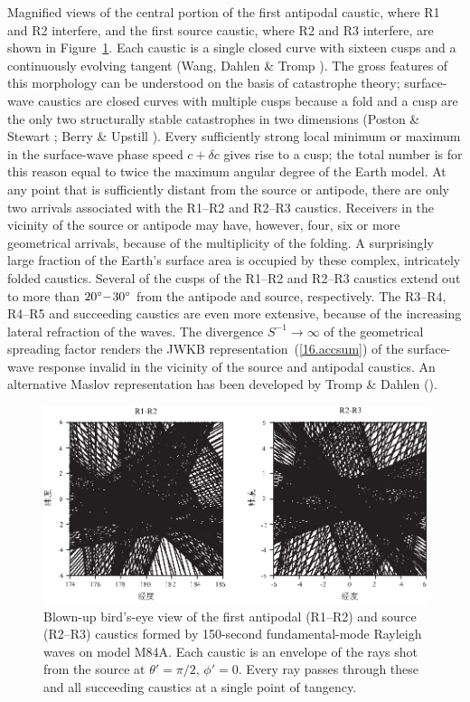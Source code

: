Magnified views of the central portion of
the first antipodal caustic,
where R1 and R2 interfere,
and the first source caustic,
where R2 and R3 interfere, are shown in Figure~\ref{fig:16.caustics}.
Each caustic is a single closed curve with sixteen
cusps and a continuously evolving tangent
(Wang, Dahlen \& Tromp \citeyear{wang&al93}).
The gross features of this morphology can
be understood on the basis of catastrophe theory;
surface-wave caustics are closed
curves with multiple cusps
because a fold and a cusp are
the only two structurally stable
catastrophes in two dimensions
(Poston \& Stewart \citeyear{poston&stewart78};
Berry \& Upstill \citeyear{berry&upstill80}).
Every sufficiently strong local minimum or
maximum in the surface-wave phase speed
$c+\delta c$ gives rise to a cusp;
the total number is for this
reason equal to twice the maximum
angular degree of the Earth model.
At any point that is sufficiently distant from
the source or antipode, there are only two arrivals
associated with the R1--R2 and R2--R3 caustics.
Receivers in the vicinity of the source or antipode
may have, however, four, six or more geometrical
arrivals, because of the multiplicity of the
folding. A surprisingly large fraction of the
Earth's surface area is occupied by these
complex, intricately folded caustics.
Several of the cusps of the R1--R2 and R2--R3
caustics extend out to more than
$20^{\circ}\hspace{-0.9 mm}-\!30^{\circ}$
from the antipode and source, respectively.
The R3--R4, R4--R5 and succeeding caustics are
even more extensive, because of the increasing lateral
refraction of the waves.  The divergence $S^{-1}
\rightarrow\infty$ of the geometrical spreading
factor renders the JWKB representation~(\ref{16.accsum})
of the surface-wave response invalid in the vicinity of
the source and antipodal caustics.  An alternative
Maslov representation has been
developed by Tromp \& Dahlen (\citeyear{tromp&dahlen93}).
\begin{figure}[!t]
\begin{center}
\includegraphics{../figures/chap16/fig06.eps}
\end{center}
\caption[caustics]{\label{fig:16.caustics}
Blown-up bird's-eye view of the first antipodal (R1--R2) and source
(R2--R3) caustics formed by 150-second fundamental-mode Rayleigh
waves on model M84A.  Each caustic is an envelope of the rays shot
from the source at $\theta'=\pi/2$, $\phi'=0$.  Every ray passes through
these and all succeeding caustics at a single point of tangency.}
\end{figure}
%

